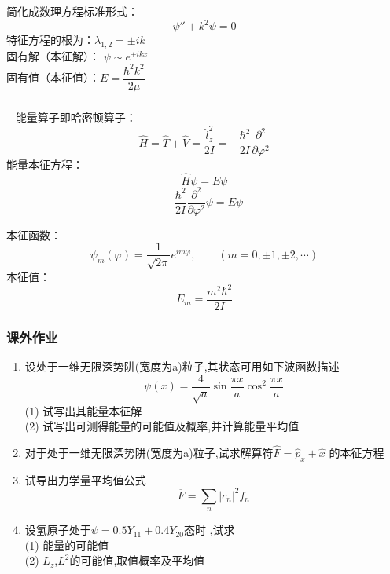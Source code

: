\begin{frame} 
    简化成数理方程标准形式：
    $$  \psi'' + k^2 \psi =0 $$
    特征方程的根为：$\lambda_{1,2}=\pm ik$ \\ \vspace{0.6em}
    固有解（本征解）： $\psi \sim e^{\pm ikx}$  \\
    固有值（本征值）：$ E= \dfrac{\hbar^2 k^2 }{2\mu} $
\end{frame}


\begin{frame} 
    \frametitle{ }
    \解~ 能量算子即哈密顿算子：
    $$ \hat{H}=\hat{T}+\hat{V}=\frac{\hat{l}_z ^2 }{2I} = -\frac{\hbar^2}{2I}\frac{\partial^2}{\partial\varphi^2} $$
    能量本征方程：
    $$ \hat{H} \psi =E \psi $$
    $$ -\frac{\hbar^2}{2I}\frac{\partial^2}{\partial\varphi^2} \psi =E \psi $$
\end{frame}

\begin{frame} 
    本征函数： $$\psi_m(\varphi)=\frac{1}{\sqrt{2\pi}}e^{im\varphi}, \qquad (m=0,\pm 1, \pm 2, \cdots)$$
    本征值： $$ E_m=\frac{m^2\hbar^2}{2I} $$     
\end{frame}

\begin{frame}
    \frametitle{课外作业}
    \begin{enumerate}
        \item 设处于一维无限深势阱(宽度为a)粒子,其状态可用如下波函数描述
        \[ \psi(x)=\frac{4}{\sqrt{a}}\sin \frac{\pi x}{a} \cos ^2 \frac{\pi x}{a}  \]
            (1) 试写出其能量本征解\\
            (2) 试写出可测得能量的可能值及概率,并计算能量平均值\\
        \item 对于处于一维无限深势阱(宽度为a)粒子,试求解算符$\hat{F}=\hat{p}_x + \hat{x}$ 的本征方程
        \item 试导出力学量平均值公式\[ \overline{F}=\sum_n \left|c_n\right|^2f_n\]
        \item 设氢原子处于$\psi=0.5Y_{11}+0.4Y_{20}$态时 ,试求\\
        (1) 能量的可能值\\
        (2) $L_z$,$L^2$的可能值,取值概率及平均值 \\
    \end{enumerate}
\end{frame}




